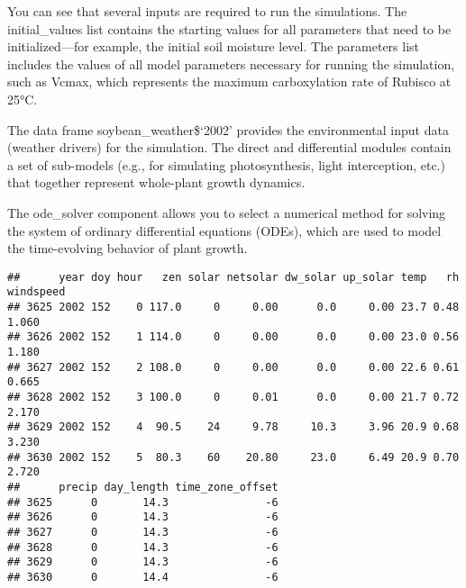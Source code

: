 \documentclass[
]{article}
\newenvironment{Shaded}{\begin{snugshade}}{\end{snugshade}}
\newcommand{\CommentTok}[1]{\textcolor[rgb]{0.56,0.35,0.01}{\textit{#1}}}
\newcommand{\FunctionTok}[1]{\textcolor[rgb]{0.13,0.29,0.53}{\textbf{#1}}}
\newcommand{\NormalTok}[1]{#1}
\newcommand{\OtherTok}[1]{\textcolor[rgb]{0.56,0.35,0.01}{#1}}
\newcommand{\SpecialCharTok}[1]{\textcolor[rgb]{0.81,0.36,0.00}{\textbf{#1}}}
\newcommand{\StringTok}[1]{\textcolor[rgb]{0.31,0.60,0.02}{#1}}
\begin{document}
You can see that several inputs are required to run the simulations. The
initial\_values list contains the starting values for all parameters
that need to be initialized---for example, the initial soil moisture
level. The parameters list includes the values of all model parameters
necessary for running the simulation, such as Vcmax, which represents
the maximum carboxylation rate of Rubisco at 25°C.

The data frame soybean\_weather\$`2002' provides the environmental input
data (weather drivers) for the simulation. The direct and differential
modules contain a set of sub-models (e.g., for simulating
photosynthesis, light interception, etc.) that together represent
whole-plant growth dynamics.

The ode\_solver component allows you to select a numerical method for
solving the system of ordinary differential equations (ODEs), which are
used to model the time-evolving behavior of plant growth.

\begin{Shaded}
\end{Shaded}

\begin{verbatim}
##      year doy hour   zen solar netsolar dw_solar up_solar temp   rh windspeed
## 3625 2002 152    0 117.0     0     0.00      0.0     0.00 23.7 0.48     1.060
## 3626 2002 152    1 114.0     0     0.00      0.0     0.00 23.0 0.56     1.180
## 3627 2002 152    2 108.0     0     0.00      0.0     0.00 22.6 0.61     0.665
## 3628 2002 152    3 100.0     0     0.01      0.0     0.00 21.7 0.72     2.170
## 3629 2002 152    4  90.5    24     9.78     10.3     3.96 20.9 0.68     3.230
## 3630 2002 152    5  80.3    60    20.80     23.0     6.49 20.9 0.70     2.720
##      precip day_length time_zone_offset
## 3625      0       14.3               -6
## 3626      0       14.3               -6
## 3627      0       14.3               -6
## 3628      0       14.3               -6
## 3629      0       14.3               -6
## 3630      0       14.4               -6
\end{verbatim}
\end{document}
